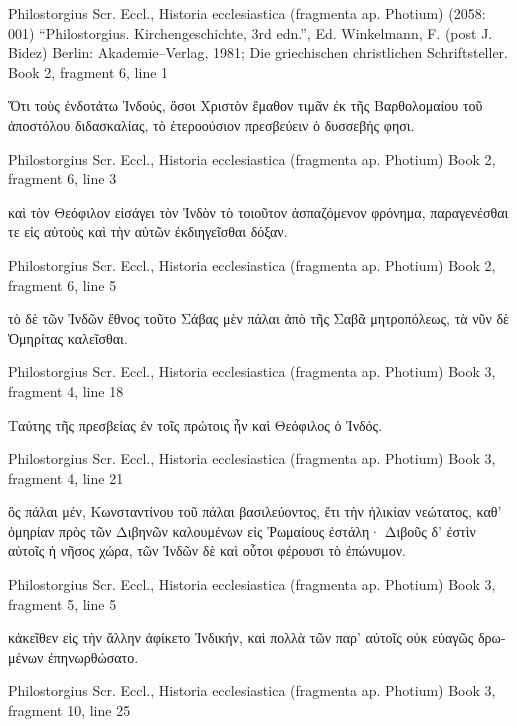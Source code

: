 \documentclass[12pt,letterpaper,twoside,final]{memoir}
\begin{document}
\begin{greek}

Philostorgius Scr. Eccl., Historia ecclesiastica (fragmenta ap. Photium) (2058: 001)
“Philostorgius. Kirchengeschichte, 3rd edn.”, Ed. Winkelmann, F. (post J. Bidez)
Berlin: Akademie–Verlag, 1981; Die griechischen christlichen Schriftsteller.
Book 2, fragment 6, line 1

Ὅτι τοὺς ἐνδοτάτω Ἰνδούς, ὅσοι Χριστὸν ἔμαθον τιμᾶν ἐκ τῆς 
Βαρθολομαίου τοῦ ἀποστόλου διδασκαλίας, τὸ ἑτεροούσιον πρεσβεύειν 
ὁ δυσσεβής φησι. 



Philostorgius Scr. Eccl., Historia ecclesiastica (fragmenta ap. Photium) 
Book 2, fragment 6, line 3

                   καὶ τὸν Θεόφιλον εἰσάγει τὸν Ἰνδὸν τὸ τοιοῦτον 
ἀσπαζόμενον φρόνημα, παραγενέσθαι τε εἰς αὐτοὺς καὶ τὴν αὐτῶν 
ἐκδιηγεῖσθαι δόξαν. 



Philostorgius Scr. Eccl., Historia ecclesiastica (fragmenta ap. Photium) 
Book 2, fragment 6, line 5

                       τὸ δὲ τῶν Ἰνδῶν ἔθνος τοῦτο Σάβας μὲν 
πάλαι ἀπὸ τῆς Σαβᾶ μητροπόλεως, τὰ νῦν δὲ Ὁμηρίτας καλεῖσθαι. 



Philostorgius Scr. Eccl., Historia ecclesiastica (fragmenta ap. Photium) 
Book 3, fragment 4, line 18

Ταύτης τῆς πρεσβείας ἐν τοῖς πρώτοις ἦν καὶ Θεόφιλος ὁ Ἰνδός. 



Philostorgius Scr. Eccl., Historia ecclesiastica (fragmenta ap. Photium) 
Book 3, fragment 4, line 21


ὃς πάλαι μέν, Κωνσταντίνου τοῦ πάλαι βασιλεύοντος, ἔτι τὴν ἡλικίαν 
νεώτατος, καθ' ὁμηρίαν πρὸς τῶν Διβηνῶν καλουμένων εἰς Ῥωμαίους 
ἐστάλη· Διβοῦς δ' ἐστὶν αὐτοῖς ἡ νῆσος χώρα, τῶν Ἰνδῶν δὲ καὶ 
οὗτοι φέρουσι τὸ ἐπώνυμον. 



Philostorgius Scr. Eccl., Historia ecclesiastica (fragmenta ap. Photium) 
Book 3, fragment 5, line 5

                                               κἀκεῖθεν εἰς τὴν ἄλλην 
ἀφίκετο Ἰνδικήν, καὶ πολλὰ τῶν παρ' αὐτοῖς οὐκ εὐαγῶς δρωμένων 
ἐπηνωρθώσατο. 



Philostorgius Scr. Eccl., Historia ecclesiastica (fragmenta ap. Photium) 
Book 3, fragment 10, line 25


\end{greek}
\end{document}
